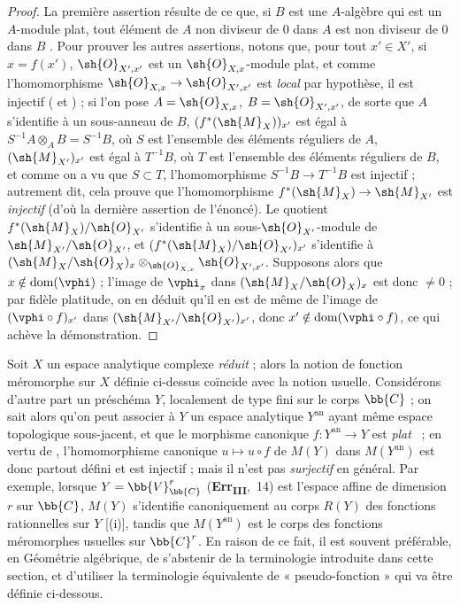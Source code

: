 \begin{proof}
La première assertion résulte de ce que, si $B$ est une $A$-algèbre qui est un $A$-module plat, tout élément de $A$ non diviseur de $0$ dans $A$ est non diviseur de $0$ dans $B$ .
Pour prouver les autres assertions, notons que, pour tout $x'\in X'$, si $x=f(x')$, $\sh{O}_{X',x'}$ est un $\sh{O}_{X,x}$-module plat, et comme l'homomorphisme $\sh{O}_{X,x}\to\sh{O}_{X',x'}$ est \emph{local} par hypothèse, il est injectif ( et ) ; si l'on pose $A=\sh{O}_{X,x}$, $B=\sh{O}_{X',x'}$, de sorte que $A$ s'identifie à un sous-anneau de $B$, $(f^*(\sh{M}_X))_{x'}$ est égal à $S^{-1}A\otimes_A B=S^{-1}B$, où $S$ est l'ensemble des éléments réguliers de $A$, $(\sh{M}_{X'})_{x'}$ est égal à $T^{-1}B$, où $T$ est l'ensemble
des éléments réguliers de $B$, et comme on a vu que $S\subset T$, l'homomorphisme $S^{-1}B\to T^{-1}B$ est injectif ; autrement dit, cela prouve que l'homomorphisme  $f^*(\sh{M}_X)\to\sh{M}_{X'}$ est \emph{injectif} (d'où la dernière assertion de l'énoncé).
Le quotient $f^*(\sh{M}_X)/\sh{O}_{X'}$ s'identifie à un sous-$\sh{O}_{X'}$-module de $\sh{M}_{X'}/\sh{O}_{X'}$, et $(f^*(\sh{M}_X)/\sh{O}_{X'})_{x'}$ s'identifie à $(\sh{M}_X/\sh{O}_X)_x\otimes_{\sh{O}_{X,x}}\sh{O}_{X',x'}$.
Supposons alors que $x\notin\operatorname{dom}(\vphi)$ ; l'image de $\vphi_x$ dans $(\sh{M}_X/\sh{O}_X)_x$ est donc $\neq0$ ; par fidèle platitude, on en déduit qu'il en est de même de l'image de $(\vphi\circ f)_{x'}$ dans $(\sh{M}_{X'}/\sh{O}_{X'})_{x'}$, donc $x'\notin\operatorname{dom}(\vphi\circ f)$, ce qui achève la démonstration.
\end{proof}

\begin{remark}[20.1.13]
\label{IV.20.1.13}
Soit $X$ un espace analytique complexe \emph{réduit} ; alors la notion de fonction méromorphe sur $X$ définie ci-dessus coïncide avec la notion usuelle.
Considérons d'autre part un préschéma $Y$, localement de type fini sur le corps $\bb{C}$ ; on sait alors qu'on peut associer à $Y$ un espace analytique $Y^\mathrm{an}$ ayant même espace topologique sous-jacent, et que le morphisme canonique $f:Y^\mathrm{an}\to Y$ est \emph{plat}~\cite{IV-37} ; en vertu de , l'homomorphisme canonique $u\mapsto u\circ f$ de $M(Y)$ dans $M(Y^\mathrm{an})$ est donc partout défini et est injectif ; mais il n'est pas \emph{surjectif} en général.
Par exemple, lorsque $Y=\bb{V}_{\bb{C}}^r$ (\textbf{Err}\textsubscript{\textbf{III}},~14) est l'espace affine de dimension $r$ sur $\bb{C}$, $M(Y)$ s'identifie canoniquement au corps $R(Y)$ des fonctions rationnelles sur $Y$ [(i)], tandis que $M(Y^\mathrm{an})$ est le corps des fonctions méromorphes usuelles sur $\bb{C}^r$.
En raison de ce fait, il est souvent préférable, en Géométrie algébrique, de s'abstenir de la terminologie introduite dans cette section, et d'utiliser la terminologie équivalente de « pseudo-fonction » qui va être définie ci-dessous.
\end{remark}

